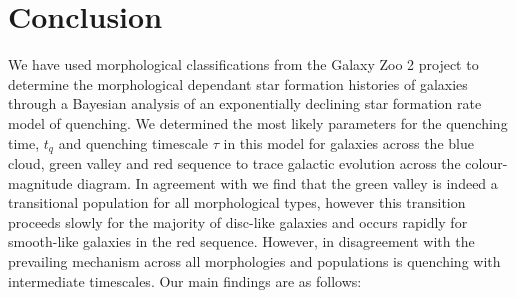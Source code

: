 \documentclass[useAMS,usenatbib]{mn2e}
\def\changed    {\color{titlecol} }
\begin{document}
\section{Conclusion}\label{conc}
We have used morphological classifications from the Galaxy Zoo 2 project to determine the morphological dependant star formation histories of galaxies through a Bayesian analysis of an exponentially declining star formation rate model of quenching. We determined the most likely parameters for the quenching time, $t_q$ and quenching timescale $\tau$ in this model for galaxies across the blue cloud, green valley and red sequence to trace galactic evolution across the colour-magnitude diagram. In agreement with \citet{Sch2014} we find that the green valley is indeed a transitional population for all morphological types, however this transition proceeds slowly for the majority of disc-like galaxies and occurs rapidly for smooth-like galaxies in the red sequence. However, in disagreement with \citet{Sch2014} {\changed the prevailing mechanism across all morphologies and populations is quenching with intermediate timescales}. Our main findings are as follows:
\end{document}
